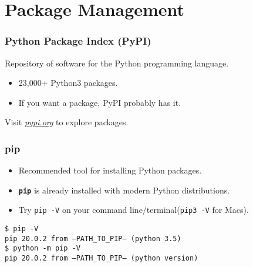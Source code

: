     \section{Package Management}

    \begin{frame}
        \frametitle{Python Package Index (PyPI)}
        \pause
        \huge
        Repository of software for the Python programming language.
        \pause
        \begin{itemize}
            \item 23,000+ Python3 packages.
            \pause
            \item If you want a package, PyPI probably has it. 
        \end{itemize}
        \pause
        Visit \href{https://pypi.org/}{\underline{\textit{pypi.org}}} to explore packages.
    \end{frame}

    \begin{frame}
        \frametitle{pip}
        \LARGE
        \pause
        \begin{itemize}
        \item Recommended tool for installing Python packages.
        \pause
        \item \textbf{\texttt{pip}} is already installed with modern Python distributions.
        \pause
        \item Try \texttt{pip -V} on your command line/terminal(\texttt{pip3 -V} for Macs). 
        \end{itemize}
        \pause
        \texttt{\$ pip -V}\\
        \texttt{pip 20.0.2 from --PATH\_TO\_PIP-- (python 3.5)}\\
        \pause
        \texttt{\$ python -m pip -V}\\
        \texttt{pip 20.0.2 from --PATH\_TO\_PIP-- (python version)}\\
    \end{frame}

